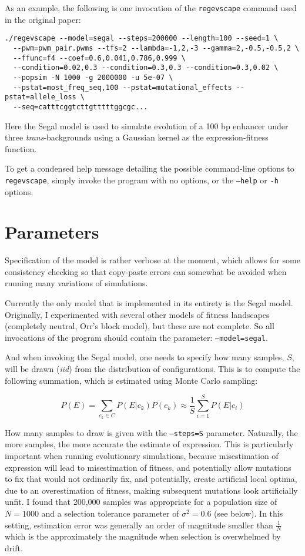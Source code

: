 \documentclass[11pt]{article}
\begin{document}
As an example, the following is one invocation of the \texttt{regevscape} command used in the original paper:

\begin{verbatim}
./regevscape --model=segal --steps=200000 --length=100 --seed=1 \
  --pwm=pwm_pair.pwms --tfs=2 --lambda=-1,2,-3 --gamma=2,-0.5,-0.5,2 \
  --ffunc=f4 --coef=0.6,0.041,0.786,0.999 \
  --condition=0.02,0.3 --condition=0.3,0.3 --condition=0.3,0.02 \
  --popsim -N 1000 -g 2000000 -u 5e-07 \
  --pstat=most_freq_seq,100 --pstat=mutational_effects --pstat=allele_loss \
  --seq=catttcggtcttgtttttggcgc...
\end{verbatim}

\noindent Here the Segal model is used to simulate evolution of a 100 bp enhancer under three \emph{trans}-backgrounds using a Gaussian kernel as the expression-fitness function.

To get a condensed help message detailing the possible command-line options to \texttt{regevscape}, simply invoke the program with no options, or the \texttt{--help} or \texttt{-h} options.

\section{Parameters}

Specification of the model is rather verbose at the moment, which allows for some consistency checking so that copy-paste errors can somewhat be avoided when running many variations of simulations. 

Currently the only model that is implemented in its entirety is the Segal model. Originally, I experimented with several other models of fitness landscapes (completely neutral, Orr's block model), but these are not complete. So all invocations of the program should contain the parameter: \texttt{--model=segal}.

And when invoking the Segal model, one needs to specify how many samples, $S$, will be drawn (\emph{iid}) from the distribution of configurations. This is to compute the following summation, which is estimated using Monte Carlo sampling: 

\begin{displaymath}
P(E) = \sum_{c_k \in C}P(E|c_k)P(c_k) \approx \frac{1}{S}\sum_{i=1}^{S}P(E|c_i) 
\end{displaymath}

\noindent How many samples to draw is given with the \texttt{--steps=S} parameter. Naturally, the more samples, the more accurate the estimate of expression. This is particularly important when running evolutionary simulations, because misestimation of expression will lead to misestimation of fitness, and potentially allow mutations to fix that would not ordinarily fix, and potentially, create artificial local optima, due to an overestimation of fitness, making subsequent mutations look artificially unfit. I found that 200,000 samples was appropriate for a population size of $N=1000$ and a selection tolerance parameter of $\sigma^2 = 0.6$ (see below). In this setting, estimation error was generally an order of magnitude smaller than $\frac{1}{N}$ which is the approximately the magnitude when selection is overwhelmed by drift.
\end{document}
